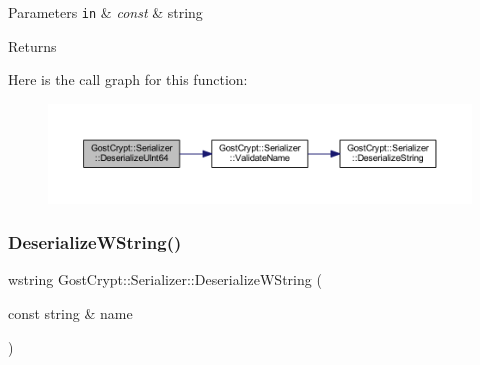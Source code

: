 \begin{DoxyParams}[1]{Parameters}
\mbox{\tt in}  & {\em const} & string \\
\hline
\end{DoxyParams}
\begin{DoxyReturn}{Returns}

\end{DoxyReturn}
Here is the call graph for this function\+:
\nopagebreak
\begin{figure}[H]
\begin{center}
\leavevmode
\includegraphics[width=350pt]{class_gost_crypt_1_1_serializer_aa4bc43dbf0915ddc8ca806893f2fe75c_cgraph}
\end{center}
\end{figure}
\mbox{\label{class_gost_crypt_1_1_serializer_ac31f5f6d18736800e791e843c1612a8b}} 
\subsubsection{\texorpdfstring{Deserialize\+W\+String()}{DeserializeWString()}\hspace{0.1cm}{\footnotesize\ttfamily [1/2]}}
{\footnotesize\ttfamily wstring Gost\+Crypt\+::\+Serializer\+::\+Deserialize\+W\+String (\begin{DoxyParamCaption}\item[{const string \&}]{name }\end{DoxyParamCaption})}


